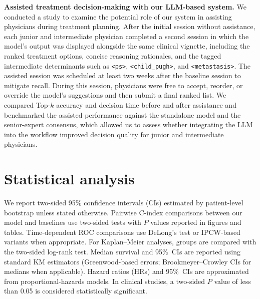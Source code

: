 \documentclass{article}
\begin{document}
\textbf{Assisted treatment decision-making with our LLM-based system.}
We conducted a study to examine the potential role of our system in assisting physicians during treatment planning. After the initial session without assistance, each junior and intermediate physician completed a second session in which the model’s output was displayed alongside the same clinical vignette, including the ranked treatment options, concise reasoning rationales, and the tagged intermediate determinants such as \texttt{<ps>}, \texttt{<child\_pugh>}, and \texttt{<metastasis>}. The assisted session was scheduled at least two weeks after the baseline session to mitigate recall. During this session, physicians were free to accept, reorder, or override the model’s suggestions and then submit a final ranked list. We compared Top-$k$ accuracy and decision time before and after assistance and benchmarked the assisted performance against the standalone model and the senior-expert consensus, which allowed us to assess whether integrating the LLM into the workflow improved decision quality for junior and intermediate physicians.


\section{Statistical analysis}
We report two-sided 95\% confidence intervals (CIs) estimated by patient-level bootstrap unless stated otherwise. Pairwise C-index comparisons between our model and baselines use two-sided tests with $P$ values reported in figures and tables. Time-dependent ROC comparisons use DeLong’s test or IPCW-based variants when appropriate. For Kaplan–Meier analyses, groups are compared with the two-sided log-rank test. Median survival and 95\%~CIs are reported using standard KM estimators (Greenwood-based errors; Brookmeyer–Crowley CIs for medians when applicable). Hazard ratios (HRs) and 95\%~CIs are approximated from proportional-hazards models. In clinical studies, a two-sided $P$ value of less than 0.05 is considered statistically significant. 
\end{document}
